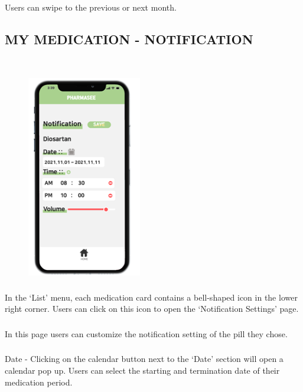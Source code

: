 \documentclass[conference]{IEEEtran}
\begin{document}
\subsubsection{}Users can swipe to the previous or next month.\\

\subsection{MY MEDICATION - NOTIFICATION}\\
\begin{figure}[h!]
\centering
\includegraphics[width=5cm]{imagefolder/noti.png}
\caption{}
\label{fig:map}
\end{figure}

\subsubsection{}In the ‘List’ menu, each medication card contains a bell-shaped icon in the lower right corner. Users can click on this icon to open the ‘Notification Settings’ page.\\

\subsubsection{}In this page users can customize the notification setting of the pill they chose.\\

\subsubsection{}Date - Clicking on the calendar button next to the ‘Date’ section will open a calendar pop up. Users can select the starting and termination date of their medication period. \\
\end{document}
